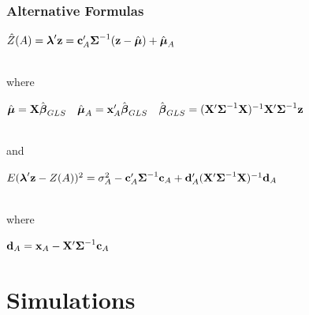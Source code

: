 \documentclass[mathserif,compress]{beamer}\usepackage{graphicx, color}
\def\bc{\mathbf{c}}
\def\bd{\mathbf{d}}
\def\bx{\mathbf{x}}
\def\bz{\mathbf{z}}
\def\bX{\mathbf{X}}
\def\bbeta{\mbox{\boldmath $\beta$}}
\def\blambda{\mbox{\boldmath $\lambda$}}
\def\bmu{\mbox{\boldmath $\mu$}}
\def\bSigma{\mbox{\boldmath $\Sigma$}}
\def\upp{^\prime}
\def\upi{^{-1}}
\begin{document}
\begin{frame}[fragile]
\frametitle{Alternative Formulas}

	\begin{center}
		$\hat{Z}(A) = \blambda\upp\bz = \bc_A\upp\bSigma\upi(\bz - \hat{\bmu}) + \hat{\bmu}_A$
	\end{center} \\
	where \\
	\begin{center}
		$\hat{\bmu} = \bX\hat{\bbeta}_{GLS} \quad \hat{\bmu}_A = \bx_A\upp\hat{\bbeta}_{GLS} \quad 
\hat{\bbeta}_{GLS} = (\bX\upp\bSigma\upi\bX)\upi\bX\upp\bSigma\upi\bz$
	\end{center} \\
	and \\
	\begin{center}
		$E(\blambda\upp\bz - Z(A))^2 = \sigma_A^2 - \bc_A\upp\bSigma\upi\bc_A + \bd_A\upp(\bX\upp\bSigma\upi\bX)\upi\bd_A$
	\end{center} \\
	where \\
	\begin{center}
		$\bd_A = \bx_A - \bX\upp\bSigma\upi\bc_A$
	\end{center} 
	


\end{frame}


\section{Simulations}
\end{document}
